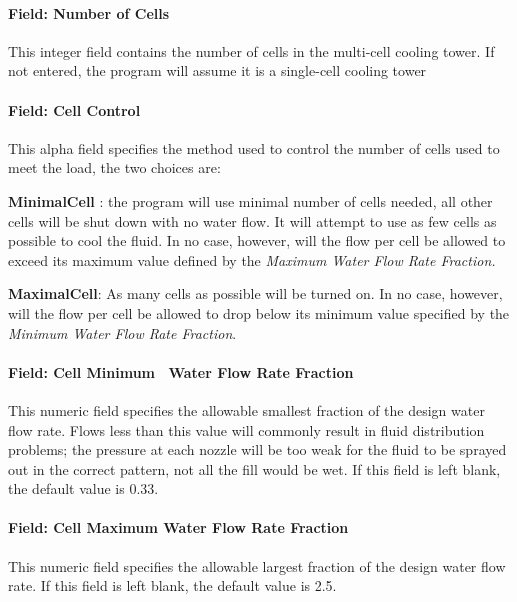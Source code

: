 \paragraph{Field: Number of Cells}\label{field-number-of-cells-2}

This integer field contains the number of cells in the multi-cell cooling tower. If not entered, the program will assume it is a single-cell cooling tower

\paragraph{Field: Cell Control}\label{field-cell-control-2}

This alpha field specifies the method used to control the number of cells used to meet the load, the two choices are:

\textbf{MinimalCell} : the program will use minimal number of cells needed, all other cells will be shut down with no water flow. It will attempt to use as few cells as possible to cool the fluid. In no case, however, will the flow per cell be allowed to exceed its maximum value defined by the \emph{Maximum Water Flow Rate Fraction.}

\textbf{MaximalCell}: As many cells as possible will be turned on. In no case, however, will the flow per cell be allowed to drop below its minimum value specified by the \emph{Minimum Water Flow Rate Fraction}.

\paragraph{Field: Cell Minimum~ Water Flow Rate Fraction}\label{field-cell-minimum-water-flow-rate-fraction-2}

This numeric field specifies the allowable smallest fraction of the design water flow rate. Flows less than this value will commonly result in fluid distribution problems; the pressure at each nozzle will be too weak for the fluid to be sprayed out in the correct pattern, not all the fill would be wet. If this field is left blank, the default value is 0.33.

\paragraph{Field: Cell Maximum Water Flow Rate Fraction}\label{field-cell-maximum-water-flow-rate-fraction-2}

This numeric field specifies the allowable largest fraction of the design water flow rate. If this field is left blank, the default value is 2.5.

